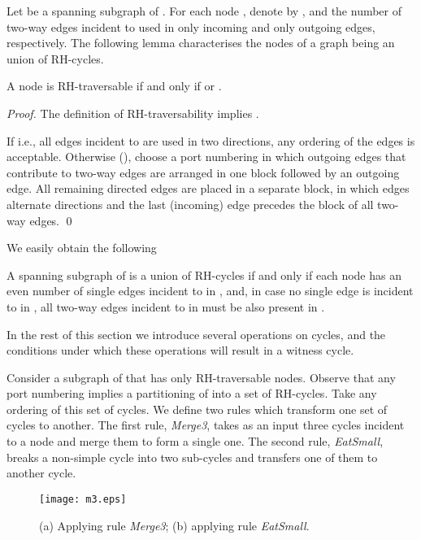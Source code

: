 \documentclass[11pt,envcountsame,oribibl]{llncs}
\begin{document}
Let  be a spanning subgraph of . For each node ,
denote by ,  and  the number of two-way edges incident
to  used in  only incoming and only outgoing edges,
respectively.
The following lemma characterises the nodes of a graph being an union of RH-cycles.

\begin{lemma} \label{lm:RHchar}
A node  is RH-traversable if and only if  or .
\end{lemma}

\begin{proof}
 The definition of RH-traversability implies .

\noindent
 If  i.e., all edges incident to
 are used in two directions, any ordering of the edges is acceptable.
Otherwise (), choose a port numbering in which outgoing edges that contribute
to two-way edges are arranged in one block followed by an outgoing edge.
All remaining directed edges are placed in a separate block, in which
edges alternate directions and the last (incoming) edge precedes the block
of all two-way edges. \qed
\end{proof}

\vspace*{-0.15cm}
We easily obtain the following

\begin{corollary} \label{cor:RHchar}
A spanning subgraph  of  is a union of RH-cycles
if and only if each node  has an even number of single edges
incident to  in , and, in case no single
edge is incident to  in , all two-way edges
incident to  in  must be also present in .
\end{corollary}

In the rest of this section we introduce several operations on cycles,
and the conditions under which these operations will result in a witness cycle.



Consider a subgraph  of  that has only RH-traversable nodes.
Observe that any
port numbering implies a partitioning of  into a set of RH-cycles.
Take any ordering  of this set of cycles. We define two rules
which transform one set of cycles to another. The first rule, {\em Merge3},
takes as an input three cycles
incident to a node and merge them to form a single one. The
second rule, {\em EatSmall}, breaks a non-simple cycle into two
sub-cycles and transfers one of them to another cycle.



\begin{figure}
\begin{center}
\texttt{[image: m3.eps]}
\end{center}
\caption{(a) Applying rule {\em Merge3}; (b) applying rule {\em EatSmall}.\label{Fig:merge3}\label{Fig:eatSmall}}
\end{figure}
\end{document}
